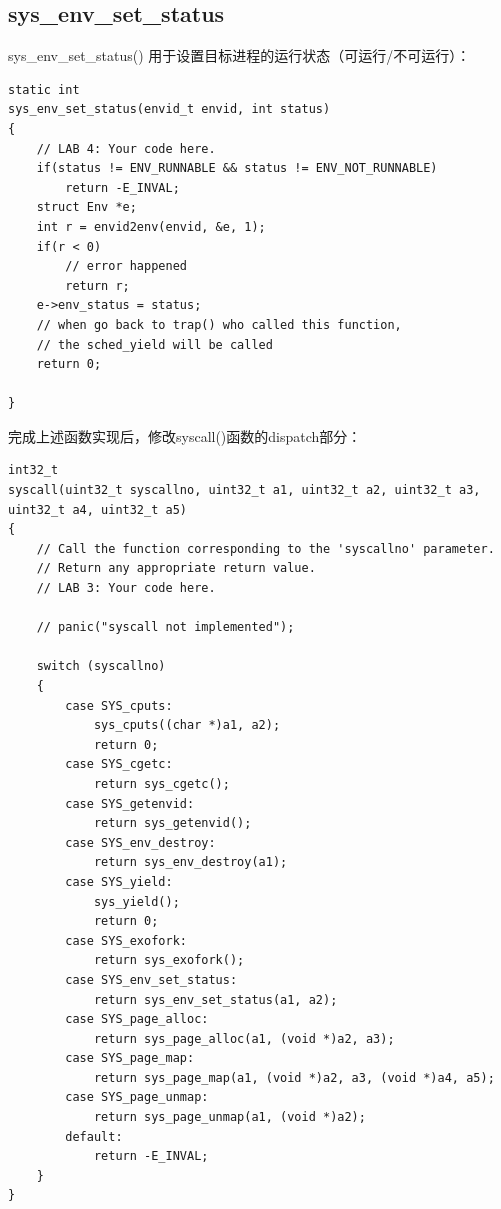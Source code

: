\documentclass[12pt, letterpaper]{report}
\begin{document}
\subsection{\large sys\_env\_set\_status}
sys\_env\_set\_status() 用于设置目标进程的运行状态（可运行/不可运行）：\par 
\lstset{style=CStyle}
\setmainfont{Consolas}
\begin{lstlisting}
static int
sys_env_set_status(envid_t envid, int status)
{
    // LAB 4: Your code here.
    if(status != ENV_RUNNABLE && status != ENV_NOT_RUNNABLE)
        return -E_INVAL;
    struct Env *e;
    int r = envid2env(envid, &e, 1);
    if(r < 0)
        // error happened
        return r;
    e->env_status = status;
    // when go back to trap() who called this function,
    // the sched_yield will be called
    return 0;

}
\end{lstlisting}
\setmainfont{Times New Roman}

\newpage
完成上述函数实现后，修改syscall()函数的dispatch部分：\par 
\lstset{style=CStyle}
\setmainfont{Consolas}
\begin{lstlisting}
int32_t
syscall(uint32_t syscallno, uint32_t a1, uint32_t a2, uint32_t a3, uint32_t a4, uint32_t a5)
{
    // Call the function corresponding to the 'syscallno' parameter.
    // Return any appropriate return value.
    // LAB 3: Your code here.

    // panic("syscall not implemented");

    switch (syscallno) 
    {
        case SYS_cputs:
            sys_cputs((char *)a1, a2);
            return 0;
        case SYS_cgetc:
            return sys_cgetc();
        case SYS_getenvid:
            return sys_getenvid();
        case SYS_env_destroy:
            return sys_env_destroy(a1);
        case SYS_yield:
            sys_yield();
            return 0;
        case SYS_exofork:
            return sys_exofork();
        case SYS_env_set_status:
            return sys_env_set_status(a1, a2);
        case SYS_page_alloc:
            return sys_page_alloc(a1, (void *)a2, a3);
        case SYS_page_map:
            return sys_page_map(a1, (void *)a2, a3, (void *)a4, a5);
        case SYS_page_unmap:
            return sys_page_unmap(a1, (void *)a2);
        default:
            return -E_INVAL;
    }
}
\end{lstlisting}
\setmainfont{Times New Roman}

\end{document}
